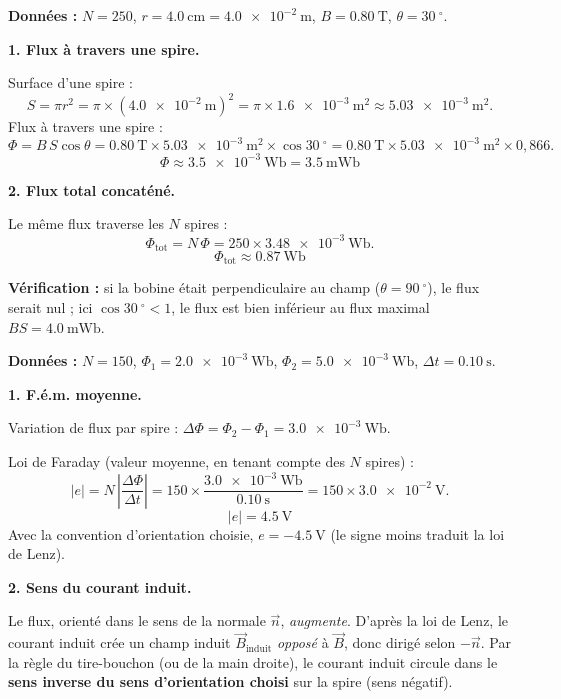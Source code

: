 \documentclass[11pt]{article}
\providecommand{\degree}{^{\circ}}
\begin{document}
\begin{corrige}
\textbf{Données :} $N = 250$, $r = \SI{4,0}{\centi\meter} = \SI{4,0e-2}{\meter}$, $B = \SI{0,80}{\tesla}$, $\theta = \SI{30}{\degree}$.

\textbf{1. Flux à travers une spire.}

Surface d'une spire :
\[
S = \pi r^2 = \pi \times (\SI{4,0e-2}{\meter})^2 = \pi \times \SI{1,6e-3}{\square\meter} \approx \SI{5,03e-3}{\square\meter}.
\]
Flux à travers une spire :
\[
\Phi = B\,S\cos\theta = \SI{0,80}{\tesla} \times \SI{5,03e-3}{\square\meter} \times \cos\SI{30}{\degree}
= \SI{0,80}{\tesla} \times \SI{5,03e-3}{\square\meter} \times 0,866.
\]
\[
\boxed{\Phi \approx \SI{3,5e-3}{\weber} = \SI{3,5}{\milli\weber}}
\]

\textbf{2. Flux total concaténé.}

Le même flux traverse les $N$ spires :
\[
\Phi_{\text{tot}} = N\,\Phi = 250 \times \SI{3,48e-3}{\weber}.
\]
\[
\boxed{\Phi_{\text{tot}} \approx \SI{0,87}{\weber}}
\]

\textbf{Vérification :} si la bobine était perpendiculaire au champ ($\theta = \SI{90}{\degree}$), le flux serait nul ; ici $\cos\SI{30}{\degree} < 1$, le flux est bien inférieur au flux maximal $B S = \SI{4,0}{\milli\weber}$.
\end{corrige}

\begin{corrige}
\textbf{Données :} $N = 150$, $\Phi_1 = \SI{2,0e-3}{\weber}$, $\Phi_2 = \SI{5,0e-3}{\weber}$, $\Delta t = \SI{0,10}{\second}$.

\textbf{1. F.é.m. moyenne.}

Variation de flux par spire : $\Delta\Phi = \Phi_2 - \Phi_1 = \SI{3,0e-3}{\weber}$.

Loi de Faraday (valeur moyenne, en tenant compte des $N$ spires) :
\[
|e| = N\,\left|\dfrac{\Delta\Phi}{\Delta t}\right| = 150 \times \dfrac{\SI{3,0e-3}{\weber}}{\SI{0,10}{\second}} = 150 \times \SI{3,0e-2}{\volt}.
\]
\[
\boxed{|e| = \SI{4,5}{\volt}}
\]
Avec la convention d'orientation choisie, $e = -\SI{4,5}{\volt}$ (le signe moins traduit la loi de Lenz).

\textbf{2. Sens du courant induit.}

Le flux, orienté dans le sens de la normale $\vec{n}$, \emph{augmente}. D'après la loi de Lenz, le courant induit crée un champ induit $\vec{B}_{\text{induit}}$ \emph{opposé} à $\vec{B}$, donc dirigé selon $-\vec{n}$. Par la règle du tire-bouchon (ou de la main droite), le courant induit circule dans le \textbf{sens inverse du sens d'orientation choisi} sur la spire (sens négatif).
\end{corrige}
\end{document}
